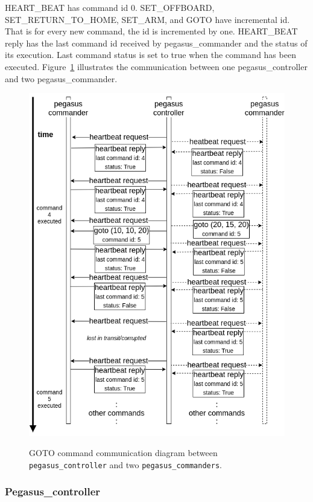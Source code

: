 HEART\_BEAT has command id 0. SET\_OFFBOARD, SET\_RETURN\_TO\_HOME, SET\_ARM, and GOTO have incremental id. That is for every new command, the id is incremented by one. HEART\_BEAT reply has the last command id received by pegasus\_commander and the status of its execution. Last command status is set to true when the command has been executed. Figure~\ref{fig:communitation-controller-commander} illustrates the communication between one pegasus\_controller and two pegasus\_commander.

\begin{figure}
	\centering
	\caption[Communication between \texttt{pegasus\_controller} and two \texttt{pegasus\_commander}.]{\small GOTO command communication diagram between \texttt{pegasus\_controller} and two \texttt{pegasus\_commanders}.}
	\includegraphics[width=5in]{figures/methodology/methodology-commander-controller-communication}
	\label{fig:communitation-controller-commander}
\end{figure}

\subsubsection{Pegasus\_controller}

